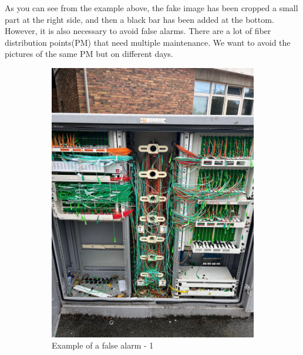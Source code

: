 As you can see from the example above, the fake image has been cropped a small part at the right side, and then a black bar has been added at the bottom. However, it is also necessary to avoid false alarms. There are a lot of fiber distribution points(PM) that need multiple maintenance. We want to avoid the pictures of the same PM but on different days.

\begin{figure}[H]
    \centering
    \begin{subfigure}{0.3\textwidth}
        \includegraphics[width=\linewidth]{images/false_positif/5173534_1.jpg}
        \caption{Example of a false alarm - 1}
    \end{subfigure}
    \begin{subfigure}{0.3\textwidth}

\end{subfigure}
\end{figure}
